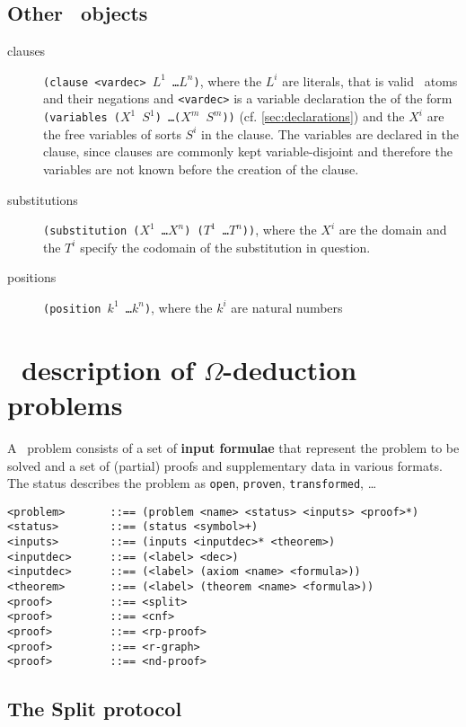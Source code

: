\subsection{Other \keim\ objects}

\begin{description}
\item[clauses] {\tt (clause <vardec> $L^1$ \ldots $L^n$)}, 
where the $L^i$ are literals, that is valid \post\ atoms and their negations and {\tt <vardec>} is a
variable declaration the of the form {\tt (variables ($X^1$ $S^1$) \ldots ($X^m$ $S^m$))} (cf.
\ref{sec:declarations}) and the $X^i$ are the free 
variables of sorts $S^i$ in the clause. The variables are declared in the clause, since clauses are
commonly kept variable-disjoint and therefore the variables are not known before the creation of the clause.

\item[substitutions] {\tt (substitution ($X^1$ \ldots $X^n$) ($T^1$ \ldots $T^n$))}, where the $X^i$ are the
domain and the $T^i$ specify the codomain of the substitution in question.

\item[positions] {\tt (position $k^1$ \ldots $k^n$)}, where the $k^i$ are natural numbers
\end{description}


\section{\post\ description of $\Omega$-deduction problems}

A \post\ problem consists of a set of {\bf input formulae} that represent the problem to be solved 
and a set of (partial) proofs and supplementary data in various formats. The status describes the 
problem as {\tt open}, {\tt proven}, {\tt transformed}, \ldots

\begin{verbatim}
<problem>       ::== (problem <name> <status> <inputs> <proof>*)
<status>        ::== (status <symbol>+)
<inputs>        ::== (inputs <inputdec>* <theorem>)
<inputdec>      ::== (<label> <dec>)
<inputdec>      ::== (<label> (axiom <name> <formula>))
<theorem>       ::== (<label> (theorem <name> <formula>))
<proof>         ::== <split>
<proof>         ::== <cnf>
<proof>         ::== <rp-proof>
<proof>         ::== <r-graph>
<proof>         ::== <nd-proof>
\end{verbatim}

\subsection{The Split protocol}


